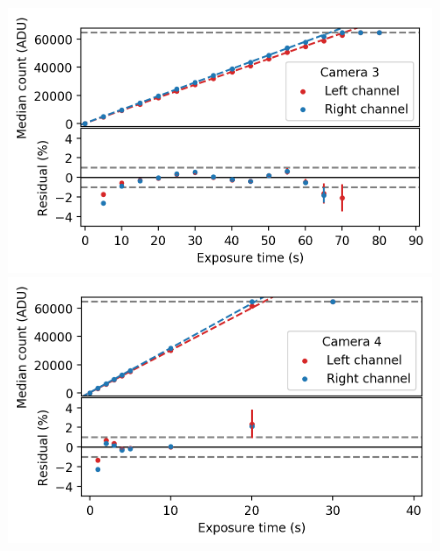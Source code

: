 \begin{colsection}
\begin{figure}[p]
\begin{center}
        \begin{minipage}[t]{0.47\linewidth}\vspace{10pt}
            \includegraphics[width=\linewidth]{images/detectors/lin_3.png}
        \end{minipage}
        \begin{minipage}[t]{0.47\linewidth}\vspace{10pt}
            \includegraphics[width=\linewidth]{images/detectors/lin_4.png}
        \end{minipage}


\end{center}
\end{figure}
\end{colsection}
